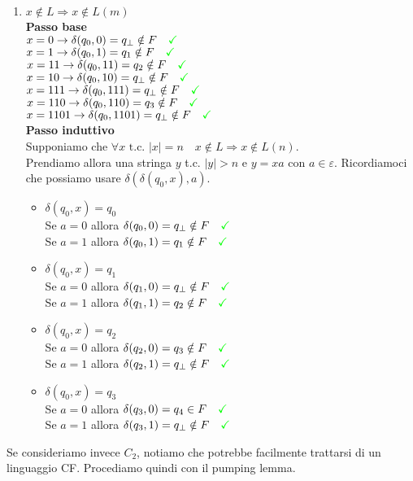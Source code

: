 \documentclass[a4paper,oneside]{scrbook}
\newcommand{\greenmark}{\quad \textcolor{green}{\checkmark}}
\begin{document}
\begin{enumerate}
	\item $x\notin L \Rightarrow x \notin L(m)$\\
	\textbf{Passo base}\\
	$x=0 \rightarrow \delta(q_0,0)=q_\bot \notin F \greenmark$\\
	$x=1 \rightarrow \delta(q_0,1)=q_1 \notin F \greenmark$\\
	$x=11 \rightarrow \delta(q_0,11)=q_2 \notin F \greenmark$\\
	$x=10 \rightarrow \delta(q_0,10)=q_\bot \notin F \greenmark$\\
	$x=111 \rightarrow \delta(q_0,111)=q_\bot \notin F \greenmark$\\
	$x=110 \rightarrow \delta(q_0,110)=q_3 \notin F \greenmark$\\
	$x=1101 \rightarrow \delta(q_0,1101)=q_\bot \notin F \greenmark$\\
	\textbf{Passo induttivo}\\
	Supponiamo che $\forall x \text{ t.c. } |x|=n \quad x \notin L \Rightarrow x\notin L(n)$.\\
	Prendiamo allora una stringa $y$ t.c. $|y|>n$ e $y=xa \text{ con }a\in\varepsilon$. Ricordiamoci che possiamo usare $\delta(\delta(q_0,x),a)$.
	\begin{itemize}
		\item $\delta(q_0,x)=q_0$\\
		Se $a=0$ allora $\delta(q_0,0)=q_\bot \notin F \greenmark$\\
		Se $a=1$ allora $\delta(q_0,1)=q_1 \notin F \greenmark$
		\item $\delta(q_0,x)=q_1$\\
		Se $a=0$ allora $\delta(q_1,0)=q_\bot \notin F \greenmark$\\
		Se $a=1$ allora $\delta(q_1,1)=q_2 \notin F \greenmark$
		\item $\delta(q_0,x)=q_2$\\
		Se $a=0$ allora $\delta(q_2,0)=q_3 \notin F \greenmark$\\
		Se $a=1$ allora $\delta(q_2,1)=q_\bot \notin F \greenmark$
		\item $\delta(q_0,x)=q_3$\\
		Se $a=0$ allora $\delta(q_3,0)=q_4 \in F \greenmark$\\
		Se $a=1$ allora $\delta(q_3,1)=q_\bot \notin F \greenmark$
	\end{itemize}
\end{enumerate}
Se consideriamo invece $C_2$, notiamo che potrebbe facilmente trattarsi di un linguaggio CF. Procediamo quindi con il pumping lemma.
\end{document}
